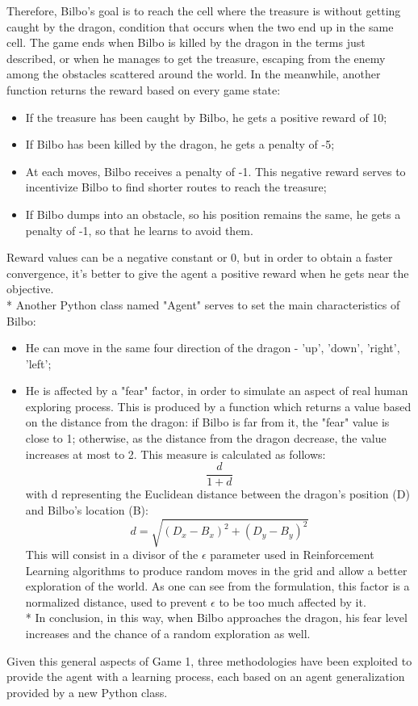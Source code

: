Therefore, Bilbo's goal is to reach the cell where the treasure is without getting caught by the dragon, condition that occurs when the two end up in the same cell. The game ends when Bilbo is killed by the dragon in the terms just described, or when he manages to get the treasure, escaping from the enemy among the obstacles scattered around the world. In the meanwhile, another function returns the reward based on every game state:
\begin{itemize}
  \item If the treasure has been caught by Bilbo, he gets a positive reward of 10;
  \item If Bilbo has been killed by the dragon, he gets a penalty of -5;
  \item At each moves, Bilbo receives a penalty of -1. This negative reward serves to incentivize Bilbo to find shorter routes to reach the treasure;
  \item If Bilbo dumps into an obstacle, so his position remains the same, he gets a penalty of -1, so that he learns to avoid them.
\end{itemize}
Reward values can be a negative constant or 0, but in order to obtain a faster convergence, it's better to give the agent a positive reward when he gets near the objective.\\*
Another Python class named "Agent" serves to set the main characteristics of Bilbo:
\begin{itemize}
  \item He can move in the same four direction of the dragon - 'up', 'down', 'right', 'left';
  \item He is affected by a "fear" factor, in order to simulate an aspect of real human exploring process. This is produced by a function which returns a value based on the distance from the dragon: if Bilbo is far from it, the "fear" value is close to 1; otherwise, as the distance from the dragon decrease, the value increases at most to 2. This measure is calculated as follows: 
  $$\frac{d}{1+d}$$
  with d representing the Euclidean distance between the dragon's position (D) and Bilbo's location (B):
  $$d=\sqrt{(D_{x}-B_{x})^2+(D_{y}-B_{y})^2}$$
  This will consist in a divisor of the $\epsilon$ parameter used in Reinforcement Learning algorithms to produce random moves in the grid and allow a better exploration of the world. As one can see from the formulation, this factor is a normalized distance, used to prevent $\epsilon$ to be too much affected by it.\\*
  In conclusion, in this way, when Bilbo approaches the dragon, his fear level increases and the chance of a random exploration as well.
\end{itemize}
Given this general aspects of Game 1, three methodologies have been exploited to provide the agent with a learning process, each based on an agent generalization provided by a new Python class.

